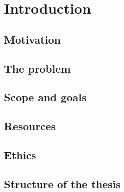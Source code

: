 \chapter{Introduction}
\label{chapter:introduction}

\section{Motivation}

\section{The problem}

\section{Scope and goals}

\section{Resources}

\section{Ethics}

\section{Structure of the thesis}